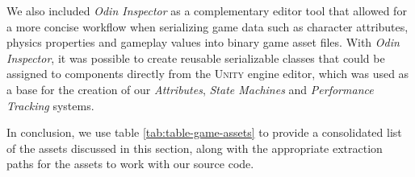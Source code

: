 We also included \emph{Odin Inspector} as a complementary editor tool that allowed for a more concise workflow when serializing game data such as character attributes, physics properties and gameplay values into binary game asset files. With \emph{Odin Inspector}, it was possible to create reusable serializable classes that could be assigned to components directly from the \textsc{Unity} engine editor, which was used as a base for the creation of our \emph{Attributes}, \emph{State Machines} and \emph{Performance Tracking} systems.

In conclusion, we use table \ref{tab:table-game-assets} to provide a consolidated list of the assets discussed in this section, along with the appropriate extraction paths for the assets to work with our source code.

